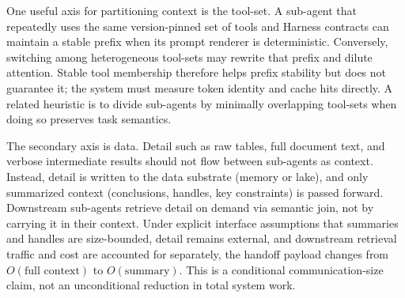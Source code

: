 One useful axis for partitioning context is the tool-set. A sub-agent that repeatedly uses the same version-pinned set of tools and Harness contracts can maintain a stable prefix when its prompt renderer is deterministic. Conversely, switching among heterogeneous tool-sets may rewrite that prefix and dilute attention. Stable tool membership therefore helps prefix stability but does not guarantee it; the system must measure token identity and cache hits directly. A related heuristic is to divide sub-agents by minimally overlapping tool-sets when doing so preserves task semantics.

The secondary axis is data. Detail such as raw tables, full document text, and verbose intermediate results should not flow between sub-agents as context. Instead, detail is written to the data substrate (memory or lake), and only summarized context (conclusions, handles, key constraints) is passed forward. Downstream sub-agents retrieve detail on demand via semantic join, not by carrying it in their context. Under explicit interface assumptions that summaries and handles are size-bounded, detail remains external, and downstream retrieval traffic and cost are accounted for separately, the handoff payload changes from $O(\text{full context})$ to $O(\text{summary})$. This is a conditional communication-size claim, not an unconditional reduction in total system work.

